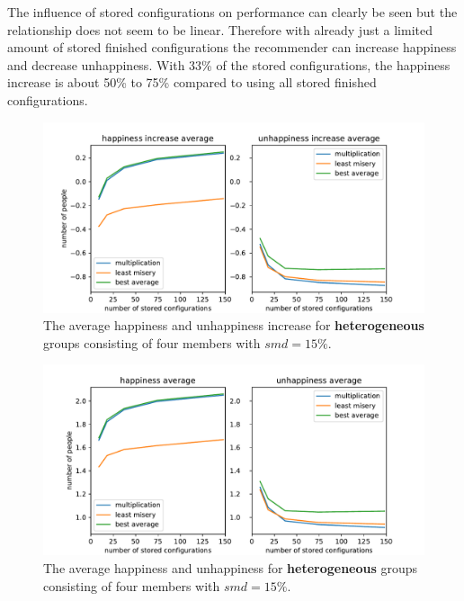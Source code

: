The influence of stored configurations on performance can clearly be seen but the relationship does not seem to be linear. Therefore with already just a limited amount of stored finished configurations the recommender can increase happiness and decrease unhappiness. With 33\% of the stored configurations, the happiness increase is about 50\% to 75\% compared to using all stored finished configurations.



\begin{figure}
    \centering
    \includegraphics[width=1\textwidth]{./figures/60_evaluation/heterogeneous_happy_unhappy_increase_amount-1000_smd-15.pdf}
    \caption{The average happiness and unhappiness increase for \textbf{heterogeneous} groups consisting of four members with $smd=15\%$.}
    \label{fig:Evaluation:HeterogenousGroupIncrease}
\end{figure}

\begin{figure}
    \centering
    \includegraphics[width=1\textwidth]{./figures/60_evaluation/heterogeneous_happy_unhappy_total_group_amount-1000_smd-15.pdf}
    \caption{The average happiness and unhappiness for \textbf{heterogeneous} groups consisting of four members with $smd=15\%$.}
    \label{fig:Evaluation:HeterogenousGroupTotal}
\end{figure}

